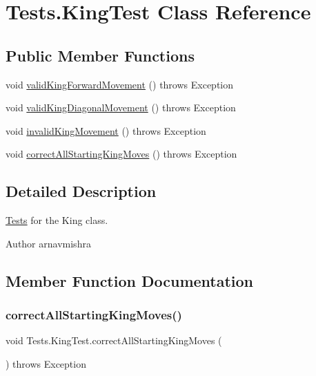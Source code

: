 \hypertarget{class_tests_1_1_king_test}{}\section{Tests.\+King\+Test Class Reference}
\label{class_tests_1_1_king_test}
\subsection*{Public Member Functions}
\begin{DoxyCompactItemize}
\item 
void \hyperlink{class_tests_1_1_king_test_ae1c17c791c61a55e41358e79d65efb6a}{valid\+King\+Forward\+Movement} ()  throws Exception 
\item 
void \hyperlink{class_tests_1_1_king_test_a297113688dc835173504e520e6e1f8e5}{valid\+King\+Diagonal\+Movement} ()  throws Exception 
\item 
void \hyperlink{class_tests_1_1_king_test_a9f87b45c5ea04ab26343e828ffac02f6}{invalid\+King\+Movement} ()  throws Exception 
\item 
void \hyperlink{class_tests_1_1_king_test_a6ebd4a43cfa189c1f572ee5978d47330}{correct\+All\+Starting\+King\+Moves} ()  throws Exception 
\end{DoxyCompactItemize}


\subsection{Detailed Description}
\hyperlink{namespace_tests}{Tests} for the King class. \begin{DoxyAuthor}{Author}
arnavmishra 
\end{DoxyAuthor}


\subsection{Member Function Documentation}
\hypertarget{class_tests_1_1_king_test_a6ebd4a43cfa189c1f572ee5978d47330}{}\label{class_tests_1_1_king_test_a6ebd4a43cfa189c1f572ee5978d47330} 
\subsubsection{\texorpdfstring{correct\+All\+Starting\+King\+Moves()}{correctAllStartingKingMoves()}}
{\footnotesize\ttfamily void Tests.\+King\+Test.\+correct\+All\+Starting\+King\+Moves (\begin{DoxyParamCaption}{ }\end{DoxyParamCaption}) throws Exception}

